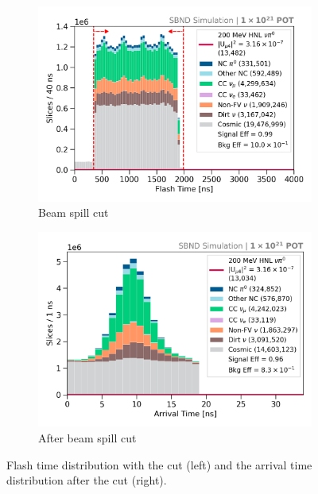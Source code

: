\begin{figure}[ht!]
        \centering
        \begin{subfigure}[b]{0.495\textwidth}
            \centering
            \includegraphics[width=\textwidth]{beamspill}
            \caption{Beam spill cut}%
            \label{fig:beamspill_cut}
        \end{subfigure}
        \hfill
        \begin{subfigure}[b]{0.495\textwidth}  
            \centering 
            \includegraphics[width=\textwidth]{beam_bucket_post_beamspill}
            \caption{After beam spill cut}%
            \label{fig:bb_beamspill}
        \end{subfigure}
	\caption[Beam Spill Cut]{
		Flash time distribution with the cut (left) and the arrival time distribution after the cut (right). 
	}
        \label{fig:cosmic_bb_cut}
\end{figure}

